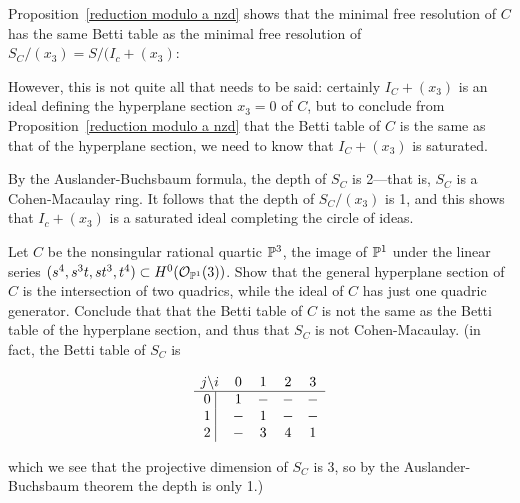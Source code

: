 \begin{example}
Proposition~\ref{reduction modulo a nzd} shows that the minimal free resolution of $C$ has the same Betti table as the minimal free resolution of $S_{C}/(x_{3}) = S/(I_{c}+(x_{3})$:

However, this is not quite all that needs to be said: certainly $I_{C}+(x_{3})$ is an ideal defining the hyperplane section $x_{3}= 0$ of $C$, but to conclude from  Proposition~\ref{reduction modulo a nzd} that the Betti table of $C$ is the same as that of the hyperplane section, we need to know that $I_{C}+(x_{3})$ is saturated.

By the Auslander-Buchsbaum formula, the depth of $S_{C}$ is 2---that is, $S_{C}$ is a Cohen-Macaulay ring. It follows that the depth of $S_{C}/(x_{3})$ is 1, and this shows that $I_{c}+(x_{3})$ is a saturated ideal completing the circle of ideas.
\end{example}

\begin{exercise}
 Let $C$ be the nonsingular rational quartic ${\mathbb P}^{3}$, the image of ${\mathbb P}^{1}$ under the linear series
 $(s^{4}, s^{3}t, st^{3}, t^{4})\subset H^{0}({\mathcal O}_{{\mathbb P}^{1}}(3))$. Show that the general hyperplane section of $C$  is the intersection of two quadrics, while the ideal of $C$ has just one quadric generator. Conclude that
  that the Betti table of $C$ is not the same as the Betti table of the hyperplane section, and thus that
  $S_{C}$ is not Cohen-Macaulay. (in fact, the Betti table of $S_{C}$ is
\begin{small}
$$
\begin{matrix}
j \backslash i &0&1&2&3\\ \hline
\text{0 }\vline &1&-&-&-\\
\text{1 }\vline &-&1&-&-\\
\text{2 }\vline &-&3&4&1\\
\end{matrix}
$$
\end{small}
 which we see that the projective dimension of $S_{C}$ is 3, so by the Auslander-Buchsbaum theorem the depth is only 1.)
\end{exercise}

